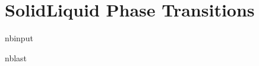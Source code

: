 \documentclass[letterpaper,10pt,english]{sphinxmanual}
\begin{document}
\chapter{Solid\textendash{}Liquid Phase Transitions}
\label{\detokenize{notebooks/L6/1_Solid_Liquid_Phase_Transitions:Solid_Liquid-Phase-Transitions}}\label{\detokenize{notebooks/L6/1_Solid_Liquid_Phase_Transitions::doc}}
\begin{sphinxuseclass}{nbinput}
\begin{sphinxuseclass}{nblast}
{
\begin{sphinxVerbatim}[commandchars=\\\{\}]
\llap{\color{nbsphinxin}[16]:\,\hspace{\fboxrule}\hspace{\fboxsep}}   
   


\end{sphinxVerbatim}}
\end{sphinxuseclass}
\end{sphinxuseclass}
\end{document}
